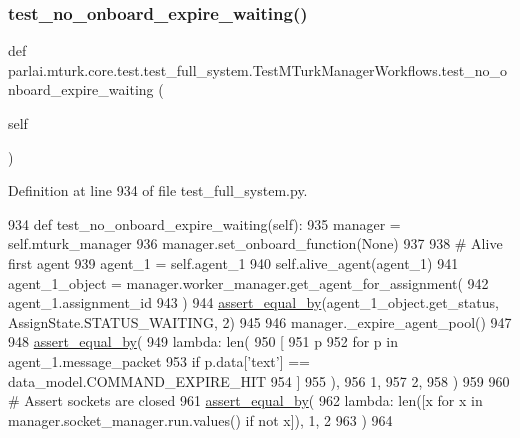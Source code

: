 \subsubsection{\texorpdfstring{test\+\_\+no\+\_\+onboard\+\_\+expire\+\_\+waiting()}{test\_no\_onboard\_expire\_waiting()}}
{\footnotesize\ttfamily def parlai.\+mturk.\+core.\+test.\+test\+\_\+full\+\_\+system.\+Test\+M\+Turk\+Manager\+Workflows.\+test\+\_\+no\+\_\+onboard\+\_\+expire\+\_\+waiting (\begin{DoxyParamCaption}\item[{}]{self }\end{DoxyParamCaption})}



Definition at line 934 of file test\+\_\+full\+\_\+system.\+py.


\begin{DoxyCode}
934     \textcolor{keyword}{def }test\_no\_onboard\_expire\_waiting(self):
935         manager = self.mturk\_manager
936         manager.set\_onboard\_function(\textcolor{keywordtype}{None})
937 
938         \textcolor{comment}{# Alive first agent}
939         agent\_1 = self.agent\_1
940         self.alive\_agent(agent\_1)
941         agent\_1\_object = manager.worker\_manager.get\_agent\_for\_assignment(
942             agent\_1.assignment\_id
943         )
944         \hyperlink{namespaceparlai_1_1mturk_1_1core_1_1test_1_1test__full__system_a0b463246d35658a2e422010f13dcf819}{assert\_equal\_by}(agent\_1\_object.get\_status, AssignState.STATUS\_WAITING, 2)
945 
946         manager.\_expire\_agent\_pool()
947 
948         \hyperlink{namespaceparlai_1_1mturk_1_1core_1_1test_1_1test__full__system_a0b463246d35658a2e422010f13dcf819}{assert\_equal\_by}(
949             \textcolor{keyword}{lambda}: len(
950                 [
951                     p
952                     \textcolor{keywordflow}{for} p \textcolor{keywordflow}{in} agent\_1.message\_packet
953                     \textcolor{keywordflow}{if} p.data[\textcolor{stringliteral}{'text'}] == data\_model.COMMAND\_EXPIRE\_HIT
954                 ]
955             ),
956             1,
957             2,
958         )
959 
960         \textcolor{comment}{# Assert sockets are closed}
961         \hyperlink{namespaceparlai_1_1mturk_1_1core_1_1test_1_1test__full__system_a0b463246d35658a2e422010f13dcf819}{assert\_equal\_by}(
962             \textcolor{keyword}{lambda}: len([x \textcolor{keywordflow}{for} x \textcolor{keywordflow}{in} manager.socket\_manager.run.values() \textcolor{keywordflow}{if} \textcolor{keywordflow}{not} x]), 1, 2
963         )
964 
\end{DoxyCode}
